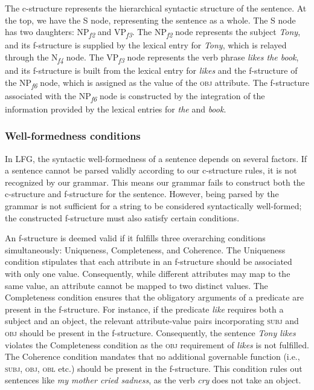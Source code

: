 \begin{sloppypar}
The c-structure represents the hierarchical syntactic structure of the sentence. At the top, we have the S node, representing the sentence as a whole. The S node has two daughters: NP\textsubscript{\textit{f2}} and VP\textsubscript{\textit{f3}}. The NP\textsubscript{\textit{f2}} node represents the subject \textit{Tony}, and its f-structure is supplied by the lexical entry for \textit{Tony}, which is relayed through the N\textsubscript{\textit{f4}} node. The VP\textsubscript{\textit{f3}} node represents the verb phrase \textit{likes the book}, and its f-structure is built from the lexical entry for \textit{likes} and the f-structure of the NP\textsubscript{\textit{f6}} node, which is assigned as the value of the \textsc{obj} attribute. The f-structure associated with the NP\textsubscript{\textit{f6}} node is constructed by the integration of the information provided by the lexical entries for \textit{the} and \textit{book}.
\end{sloppypar}

\subsubsection{Well-formedness conditions}

In LFG, the syntactic well-formedness of a sentence depends on several factors. If a sentence cannot be parsed validly according to our c-structure rules, it is not recognized by our grammar. This means our grammar fails to construct both the c-structure and f-structure for the sentence. However, being parsed by the grammar is not sufficient for a string to be considered syntactically well-formed; the constructed f-structure must also satisfy certain conditions.

An f-structure is deemed valid if it fulfills three overarching conditions simultaneously: Uniqueness, Completeness, and Coherence. The Uniqueness condition stipulates that each attribute in an f-structure should be associated with only one value. Consequently, while different attributes may map to the same value, an attribute cannot be mapped to two distinct values. The Completeness condition ensures that the obligatory arguments of a predicate are present in the f-structure. For instance, if the predicate \textit{like} requires both a subject and an object, the relevant attribute-value pairs incorporating \textsc{subj} and \textsc{obj} should be present in the f-structure. Consequently, the sentence \textit{Tony likes} violates the Completeness condition as the \textsc{obj} requirement of \textit{likes} is not fulfilled. The Coherence condition mandates that no additional governable function (i.e., \textsc{subj, obj, obl} etc.) should be present in the f-structure. This condition rules out sentences like \textit{my mother cried sadness}, as the verb \textit{cry} does not take an object.

